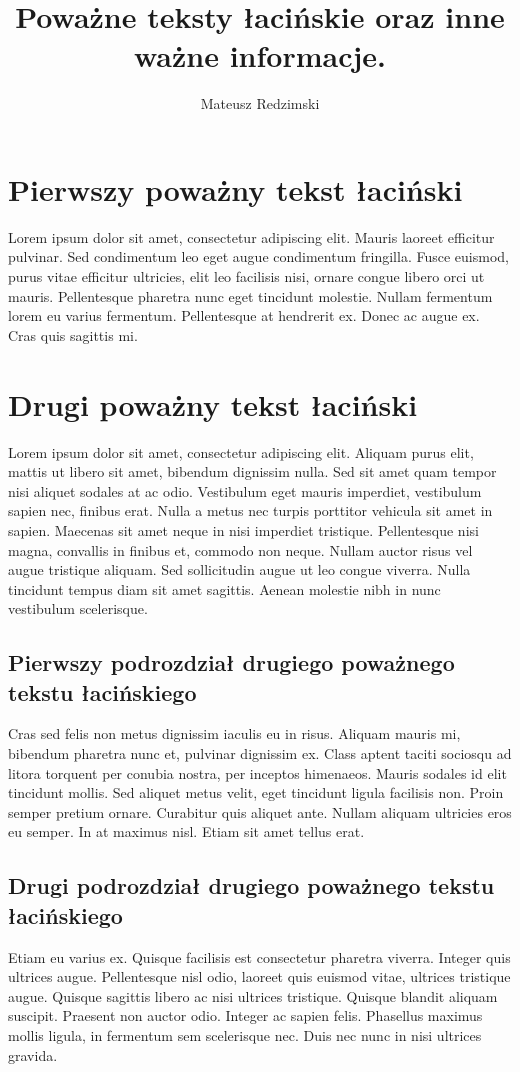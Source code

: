 \documentclass{article}
\title{Poważne teksty łacińskie oraz inne ważne informacje.}
\author{Mateusz Redzimski}
\begin{document}
\maketitle
\newpage
\pagestyle{fancy}
\tableofcontents
\listoftables
\listoffigures
\newpage
\section{Pierwszy poważny tekst łaciński}
\qquad
Lorem ipsum dolor sit amet, consectetur adipiscing elit. Mauris laoreet efficitur pulvinar. Sed condimentum leo eget augue condimentum fringilla. Fusce euismod, purus vitae efficitur ultricies, elit leo facilisis nisi, ornare congue libero orci ut mauris. Pellentesque pharetra nunc eget tincidunt molestie. Nullam fermentum lorem eu varius fermentum. Pellentesque at hendrerit ex. Donec ac augue ex. Cras quis sagittis mi.

\section{Drugi poważny tekst łaciński}
\qquad
 Lorem ipsum dolor sit amet, consectetur adipiscing elit. Aliquam purus elit, mattis ut libero sit amet, bibendum dignissim nulla. Sed sit amet quam tempor nisi aliquet sodales at ac odio. Vestibulum eget mauris imperdiet, vestibulum sapien nec, finibus erat. Nulla a metus nec turpis porttitor vehicula sit amet in sapien. Maecenas sit amet neque in nisi imperdiet tristique. Pellentesque nisi magna, convallis in finibus et, commodo non neque. Nullam auctor risus vel augue tristique aliquam. Sed sollicitudin augue ut leo congue viverra. Nulla tincidunt tempus diam sit amet sagittis. Aenean molestie nibh in nunc vestibulum scelerisque.

\subsection{ Pierwszy podrozdział drugiego poważnego tekstu łacińskiego}
\qquad
Cras sed felis non metus dignissim iaculis eu in risus. Aliquam mauris mi, bibendum pharetra nunc et, pulvinar dignissim ex. Class aptent taciti sociosqu ad litora torquent per conubia nostra, per inceptos himenaeos. Mauris sodales id elit tincidunt mollis. Sed aliquet metus velit, eget tincidunt ligula facilisis non. Proin semper pretium ornare. Curabitur quis aliquet ante. Nullam aliquam ultricies eros eu semper. In at maximus nisl. Etiam sit amet tellus erat.

\subsection{ Drugi podrozdział drugiego poważnego tekstu łacińskiego}
\qquad
Etiam eu varius ex. Quisque facilisis est consectetur pharetra viverra. Integer quis ultrices augue. Pellentesque nisl odio, laoreet quis euismod vitae, ultrices tristique augue. Quisque sagittis libero ac nisi ultrices tristique. Quisque blandit aliquam suscipit. Praesent non auctor odio. Integer ac sapien felis. Phasellus maximus mollis ligula, in fermentum sem scelerisque nec. Duis nec nunc in nisi ultrices gravida.
\end{document}
